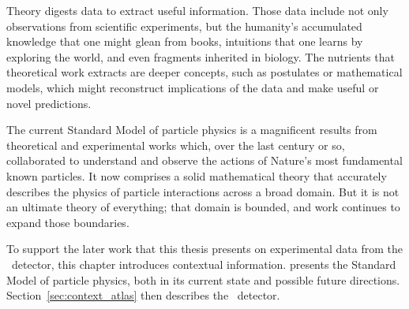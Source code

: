 Theory digests data to extract useful information.
Those data include not only observations from scientific experiments,
but the humanity's accumulated knowledge that one might glean from books,
intuitions that one learns by exploring the world,
and even fragments inherited in biology.
The nutrients that theoretical work extracts are deeper concepts,
such as postulates or mathematical models,
which might reconstruct implications of the data and make useful or novel
predictions.

The current Standard Model of particle physics is a magnificent results from
theoretical and experimental works which, over the last century or
so, collaborated to understand and observe the actions of Nature's most
fundamental known particles.
It now comprises a solid mathematical theory that accurately describes the
physics of particle interactions across a broad domain.
But it is not an ultimate theory of everything; that domain is bounded, and
work continues to expand those boundaries.

To support the later work that this thesis presents on experimental data from
the \atlas\ detector, this chapter introduces contextual information.
 presents the Standard Model of particle
physics, both in its current state and possible future directions.
Section~\ref{sec:context_atlas} then describes the \atlas\ detector.
